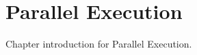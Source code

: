 \pagebreak
\chapter{Parallel Execution}
\label{chap:parallel_execution}

Chapter introduction for Parallel Execution.
